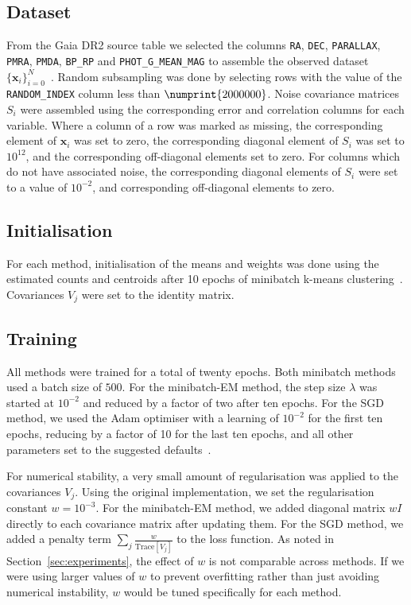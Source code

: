 \documentclass{article}
\newcommand{\bx}{\mathbf{x}}
\begin{document}
\subsection{Dataset}

From the Gaia DR2 source table we selected the columns \texttt{RA}, \texttt{DEC}, \texttt{PARALLAX}, \texttt{PMRA}, \texttt{PMDA}, \texttt{BP\_RP} and \texttt{PHOT\_G\_MEAN\_MAG} to assemble the observed dataset $\{\bx_i\}_{i=0}^N$~\cite{brownGaiaDataRelease2018}.
Random subsampling was done by selecting rows with the value of the \texttt{RANDOM\_INDEX} column less than $\numprint{2000000}$.
Noise covariance matrices $S_i$ were assembled using the corresponding error and correlation columns for each variable.
Where a column of a row was marked as missing, the corresponding element of $\bx_i$ was set to zero, the corresponding diagonal element of $S_i$ was set to $10^{12}$, and the corresponding off-diagonal elements set to zero.
For columns which do not have associated noise, the corresponding diagonal elements of $S_i$ were set to a value of $10^{-2}$, and corresponding off-diagonal elements to zero.

\subsection{Initialisation}
For each method, initialisation of the means and weights was done using the estimated counts and centroids after 10 epochs of minibatch k-means clustering~\cite{sculleyWebscaleKmeansClustering2010}.
Covariances $V_j$ were set to the identity matrix.

\subsection{Training}

All methods were trained for a total of twenty epochs.
Both minibatch methods used a batch size of $500$.
For the minibatch-EM method, the step size $\lambda$ was started at $10^{-2}$ and reduced by a factor of two after ten epochs.
For the SGD method, we used the Adam optimiser with a learning of $10^{-2}$ for the first ten epochs, reducing by a factor of 10 for the last ten epochs, and all other parameters set to the suggested defaults~\cite{kingmaAdamMethodStochastic2014}.

For numerical stability, a very small amount of regularisation was applied to the covariances $V_j$.
Using the original implementation, we set the regularisation constant $w = 10^{-3}$.
For the minibatch-EM method, we added diagonal matrix $wI$ directly to each covariance matrix after updating them.
For the SGD method, we added a penalty term $\sum_j \frac{w}{\mathrm{Trace}[V_j]}$ to the loss function.
As noted in Section~\ref{sec:experiments}, the effect of $w$ is not comparable across methods.
If we were using larger values of $w$ to prevent overfitting rather than just avoiding numerical instability, $w$ would be tuned specifically for each method.
\end{document}
